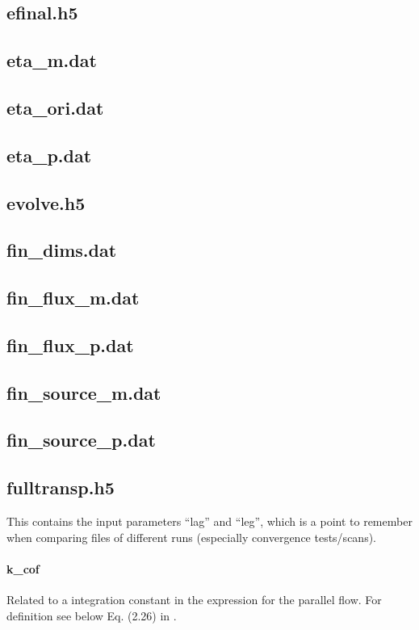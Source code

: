 \subsection{efinal.h5}

\subsection{eta\_m.dat}
\subsection{eta\_ori.dat}
\subsection{eta\_p.dat}

\subsection{evolve.h5}

\subsection{fin\_dims.dat}
\subsection{fin\_flux\_m.dat}
\subsection{fin\_flux\_p.dat}

\subsection{fin\_source\_m.dat}
\subsection{fin\_source\_p.dat}

\subsection{fulltransp.h5}
This contains the input parameters ``lag'' and ``leg'', which is a point
to remember when comparing files of different runs (especially
convergence tests/scans).

\paragraph{k_cof}
Related to a integration constant in the expression for the parallel
flow. For definition see below Eq. (2.26) in \cite{Martitsch:Thesis:16}.

